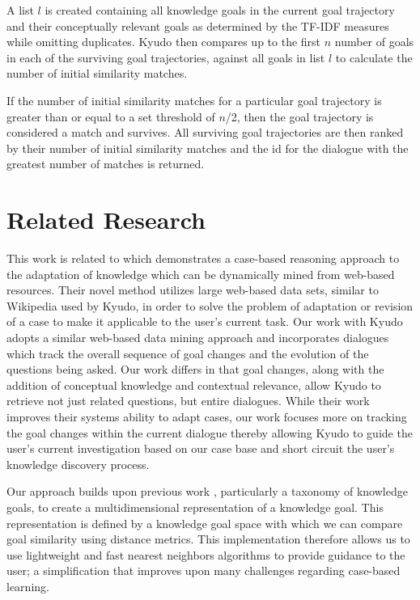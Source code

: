 \documentclass{llncs}
\begin{document}
    A list $l$ is created containing all knowledge goals in the current goal trajectory and their conceptually relevant goals as determined by the TF-IDF measures while omitting duplicates. Kyudo then compares up to the first $n$ number of goals in each of the surviving goal trajectories, against all goals in list $l$ to calculate the number of initial similarity matches.

    If the number of initial similarity matches for a particular goal trajectory is greater than or equal to a set threshold of $n$/2, then the goal trajectory is considered a match and survives. All surviving goal trajectories are then ranked by their number of initial similarity matches and the id for the dialogue with the greatest number of matches is returned. 

\section{Related Research}
This work is related to \cite{powell_2011} which demonstrates a case-based reasoning approach to the adaptation of knowledge which can be dynamically mined from web-based resources. Their novel method utilizes large web-based data sets, similar to Wikipedia used by Kyudo, in order to solve the problem of adaptation or revision of a case to make it applicable to the user's current task. Our work with Kyudo adopts a similar web-based data mining approach and incorporates dialogues which track the overall sequence of goal changes and the evolution of the questions \cite{ram_1991} being asked. Our work differs in that goal changes, along with the addition of conceptual knowledge and contextual relevance, allow Kyudo to retrieve not just related questions, but entire dialogues. While their work improves their systems ability to adapt cases, our work focuses more on tracking the goal changes within the current dialogue thereby allowing Kyudo to guide the user's current investigation based on our case base and short circuit the user's knowledge discovery process.
	
	Our approach builds upon previous work \cite{bengfort_interactive_2015}, particularly a taxonomy of knowledge goals,  to create a multidimensional representation of a knowledge goal. This representation is defined by a knowledge goal space with which we can compare goal similarity using distance metrics. This implementation therefore allows us to use lightweight and fast nearest neighbors algorithms to provide guidance to the user; a simplification that improves upon many challenges regarding case-based learning.
\end{document}
